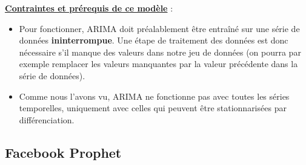 \documentclass[french]{article}
\begin{document}
    \underline{\textbf{Contraintes et prérequis de ce modèle}} : 
    \begin{itemize}
        \item Pour fonctionner, ARIMA doit préalablement être entraîné sur une série de données \textbf{ininterrompue}. Une étape de traitement des données est donc nécessaire s'il manque des valeurs dans notre jeu de données (on pourra par exemple remplacer les valeurs manquantes par la valeur précédente dans la série de données).
        \item Comme nous l'avons vu, ARIMA ne fonctionne pas avec toutes les séries temporelles, uniquement avec celles qui peuvent être stationnarisées par différenciation.
    \end{itemize}
    
    \subsection{Facebook Prophet}
\end{document}
